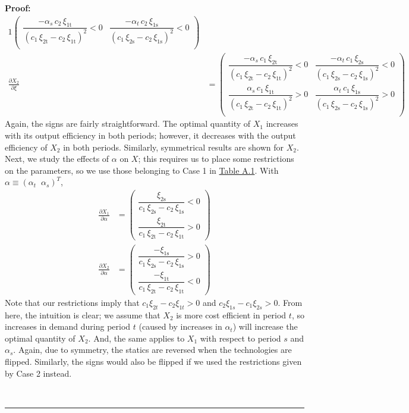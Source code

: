 \documentclass[11pt,a4paper,leqno]{extarticle}
\newenvironment{proof}[1][Proof]{\noindent\textbf{#1:} }{\ \rule{0.5em}{0.5em}}
\begin{document}
\begin{proof}
\begin{alignat*}{1}
\begin{pmatrix}
		\dfrac{-\alpha _{s}\,c_{2}\,\xi _{\mathrm{1t}}}{{\left(c_{1}\,\xi _{\mathrm{2t}}-c_{2}\,\xi _{\mathrm{1t}}\right)}^2}<0 & \dfrac{-\alpha _{t}\,c_{2}\,\xi _{\mathrm{1s}}}{{\left(c_{1}\,\xi _{\mathrm{2s}}-c_{2}\,\xi _{\mathrm{1s}}\right)}^2}<0 \\
		\end{pmatrix}\\
		\frac{\partial X_2}{\partial \xi} &= 
		\begin{pmatrix}
		\dfrac{-\alpha _{s}\,c_{1}\,\xi _{\mathrm{2t}}}{{\left(c_{1}\,\xi _{\mathrm{2t}}-c_{2}\,\xi _{\mathrm{1t}}\right)}^2} <0& \dfrac{-\alpha _{t}\,c_{1}\,\xi _{\mathrm{2s}}}{{\left(c_{1}\,\xi _{\mathrm{2s}}-c_{2}\,\xi _{\mathrm{1s}}\right)}^2} <0\\
		\dfrac{\alpha _{s}\,c_{1}\,\xi _{\mathrm{1t}}}{{\left(c_{1}\,\xi _{\mathrm{2t}}-c_{2}\,\xi _{\mathrm{1t}}\right)}^2}>0& \dfrac{\alpha _{t}\,c_{1}\,\xi _{\mathrm{1s}}}{{\left(c_{1}\,\xi _{\mathrm{2s}}-c_{2}\,\xi _{\mathrm{1s}}\right)}^2} >0\\
		\end{pmatrix}
		\end{alignat*}
		Again, the signs are fairly straightforward. The optimal quantity of $X_1$ increases with its output efficiency in both periods; however, it decreases with the output efficiency of $X_2$ in both periods. Similarly, symmetrical results are shown for $X_2$. Next, we study the effects of $\alpha$ on $X$; this requires us to place some restrictions on the parameters, so we use those belonging to Case 1 in \hyperref[tab:paramrest]{Table A.1}. With $\alpha \equiv \left( \alpha_t \;\; \alpha_s \right)^T$, 
		\begin{align*}
		\frac{\partial X_1}{\partial \alpha} &= 
		\begin{pmatrix}
		\dfrac{\xi _{\mathrm{2s}}}{c_{1}\,\xi _{\mathrm{2s}}-c_{2}\,\xi _{\mathrm{1s}}}<0 \\
		\dfrac{\xi _{\mathrm{2t}}}{c_{1}\,\xi _{\mathrm{2t}}-c_{2}\,\xi _{\mathrm{1t}}}>0
		\end{pmatrix}\\
		\frac{\partial X_2}{\partial \alpha} &= 
		\begin{pmatrix}
		\dfrac{-\xi _{\mathrm{1s}}}{c_{1}\,\xi _{\mathrm{2s}}-c_{2}\,\xi _{\mathrm{1s}}}>0 \\
		\dfrac{-\xi _{\mathrm{1t}}}{c_{1}\,\xi _{\mathrm{2t}}-c_{2}\,\xi _{\mathrm{1t}}}<0
		\end{pmatrix}
		\end{align*}
		Note that our restrictions imply that $c_1 \xi_{2t} - c_2 \xi_{1t} > 0$ and $c_2 \xi_{1s} - c_1 \xi_{2s} > 0$. From here, the intuition is clear; we assume that $X_2$ is more cost efficient in period $t$, so increases in demand during period $t$ (caused by increases in $\alpha_t$) will increase the optimal quantity of $X_2$. And, the same applies to $X_1$ with respect to period $s$ and $\alpha_s$. Again, due to symmetry, the statics are reversed when the technologies are flipped. Similarly, the signs would also be flipped if we used the restrictions given by Case 2 instead. 
		

\end{proof}
\end{document}
